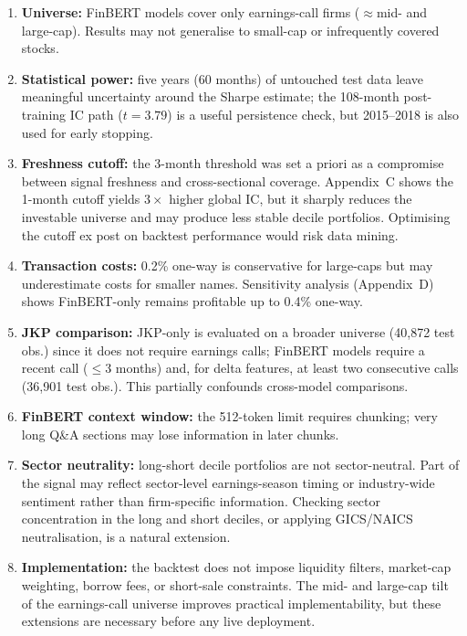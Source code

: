 \begin{enumerate}[noitemsep]
    \item \textbf{Universe:} FinBERT models cover only earnings-call firms ($\approx$mid- and large-cap). Results may not generalise to small-cap or infrequently covered stocks.
    \item \textbf{Statistical power:} five years (60 months) of untouched test data leave meaningful uncertainty around the Sharpe estimate; the 108-month post-training IC path ($t = 3.79$) is a useful persistence check, but 2015--2018 is also used for early stopping.
    \item \textbf{Freshness cutoff:} the 3-month threshold was set a priori as a compromise between signal freshness and cross-sectional coverage. Appendix~C shows the 1-month cutoff yields $3\times$ higher global IC, but it sharply reduces the investable universe and may produce less stable decile portfolios. Optimising the cutoff ex post on backtest performance would risk data mining.
    \item \textbf{Transaction costs:} 0.2\% one-way is conservative for large-caps but may underestimate costs for smaller names. Sensitivity analysis (Appendix~D) shows FinBERT-only remains profitable up to 0.4\% one-way.
    \item \textbf{JKP comparison:} JKP-only is evaluated on a broader universe (40,872 test obs.) since it does not require earnings calls; FinBERT models require a recent call ($\leq$3 months) and, for delta features, at least two consecutive calls (36,901 test obs.). This partially confounds cross-model comparisons.
    \item \textbf{FinBERT context window:} the 512-token limit requires chunking; very long Q\&A sections may lose information in later chunks.
    \item \textbf{Sector neutrality:} long-short decile portfolios are not sector-neutral. Part of the signal may reflect sector-level earnings-season timing or industry-wide sentiment rather than firm-specific information. Checking sector concentration in the long and short deciles, or applying GICS/NAICS neutralisation, is a natural extension.
    \item \textbf{Implementation:} the backtest does not impose liquidity filters, market-cap weighting, borrow fees, or short-sale constraints. The mid- and large-cap tilt of the earnings-call universe improves practical implementability, but these extensions are necessary before any live deployment.
\end{enumerate}
